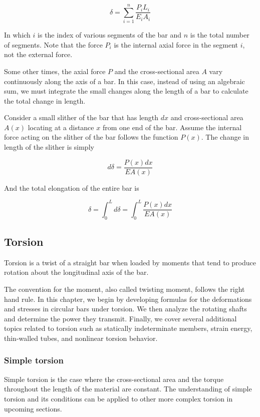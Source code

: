 \documentclass[a4paper,openany,nobib]{tufte-book}
\begin{document}
$$\delta  = \sum\limits_{i = 1}^n \frac{P_iL_i}{E_iA_i}$$

In which \(i\) is the index of various segments of the bar and \(n\) is the
total number of segments. Note that the force \(P_i\) is the internal
axial force in the segment \(i\), not the external force.

Some other times, the axial force \(P\) and the cross-sectional area \(A\)
vary continuously along the axis of a bar. In this case, instead of
using an algebraic sum, we must integrate the small changes along the
length of a bar to calculate the total change in length.

Consider a small slither of the bar that has length \(dx\) and
cross-sectional area \(A(x)\) locating at a distance \(x\) from one end of
the bar. Assume the internal force acting on the slither of the bar
follows the function \(P(x)\). The change in length of the slither is
simply


$$d\delta  = \frac{P(x)dx}{EA(x)}$$

And the total elongation of the entire bar is

$$\delta  = \int_0^L {d\delta }  = \int_0^L \frac{P(x)dx}{EA(x)}$$

\subsection{Torsion}
\label{torsion}
Torsion is a twist of a straight bar when loaded by moments that tend to
produce rotation about the longitudinal axis of the bar.

The convention for the moment, also called twisting moment, follows the
right hand rule. In this chapter, we begin by developing formulas for
the deformations and stresses in circular bars under torsion. We then
analyze the rotating shafts and determine the power they transmit.
Finally, we cover several additional topics related to torsion such as
statically indeterminate members, strain energy, thin-walled tubes, and
nonlinear torsion behavior.

\subsubsection{Simple torsion}
\label{simple-torsion}
Simple torsion is the case where the cross-sectional area and the torque
throughout the length of the material are constant. The understanding of
simple torsion and its conditions can be applied to other more complex
torsion in upcoming sections.
\end{document}
